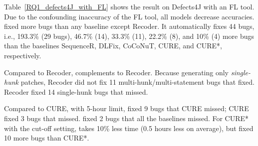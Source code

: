 Table~\ref{RQ1_defects4J_with_FL} shows the result on
Defects4J with an FL tool. Due to the confounding inaccuracy of the FL
tool, all models decrease accuracies. {\tool} fixed more bugs
than any baseline except Recoder. It automatically fixes 44 bugs,
i.e., 193.3\% (29 bugs), 46.7\% (14), 33.3\% (11), 22.2\% (8), and
10\% (4) more bugs than the baselines SequenceR, DLFix, CoCoNuT, CURE,
and CURE*, respectively.

Compared to Recoder, {\tool} complements to Recoder.  Because
generating only {\em single-hunk} patches, Recoder did not fix 11
multi-hunk/multi-statement bugs that {\tool} fixed. Recoder fixed 14
single-hunk bugs that {\tool} missed.

Compared to CURE, with 5-hour limit, {\tool} fixed 9 bugs that CURE
missed; CURE fixed 3 bugs that {\tool} missed. {\tool} fixed
2 bugs that all the baselines missed. For CURE* with the
cut-off setting, {\tool} takes 10\% less time (0.5 hours less on
average), but fixed 10 more bugs than CURE*.




%










